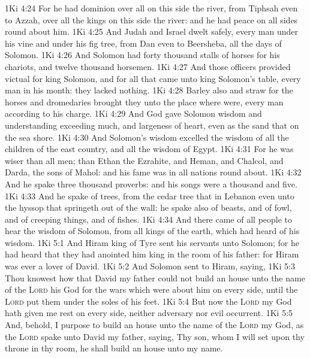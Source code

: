 \vs 1Ki 4:24 For he had dominion over all  on this side the river, from Tiphsah even to Azzah, over all the kings on this side the river: and he had peace on all sides round about him.
\vs 1Ki 4:25 And Judah and Israel dwelt safely, every man under his vine and under his fig tree, from Dan even to Beersheba, all the days of Solomon.
\vs 1Ki 4:26 And Solomon had forty thousand stalls of horses for his chariots, and twelve thousand horsemen.
\vs 1Ki 4:27 And those officers provided victual for king Solomon, and for all that came unto king Solomon's table, every man in his month: they lacked nothing.
\vs 1Ki 4:28 Barley also and straw for the horses and dromedaries brought they unto the place where  were, every man according to his charge.
\vs 1Ki 4:29 And God gave Solomon wisdom and understanding exceeding much, and largeness of heart, even as the sand that  on the sea shore.
\vs 1Ki 4:30 And Solomon's wisdom excelled the wisdom of all the children of the east country, and all the wisdom of Egypt.
\vs 1Ki 4:31 For he was wiser than all men; than Ethan the Ezrahite, and Heman, and Chalcol, and Darda, the sons of Mahol: and his fame was in all nations round about.
\vs 1Ki 4:32 And he spake three thousand proverbs: and his songs were a thousand and five.
\vs 1Ki 4:33 And he spake of trees, from the cedar tree that  in Lebanon even unto the hyssop that springeth out of the wall: he spake also of beasts, and of fowl, and of creeping things, and of fishes.
\vs 1Ki 4:34 And there came of all people to hear the wisdom of Solomon, from all kings of the earth, which had heard of his wisdom.
\vs 1Ki 5:1 And Hiram king of Tyre sent his servants unto Solomon; for he had heard that they had anointed him king in the room of his father: for Hiram was ever a lover of David.
\vs 1Ki 5:2 And Solomon sent to Hiram, saying,
\vs 1Ki 5:3 Thou knowest how that David my father could not build an house unto the name of the \textsc{Lord} his God for the wars which were about him on every side, until the \textsc{Lord} put them under the soles of his feet.
\vs 1Ki 5:4 But now the \textsc{Lord} my God hath given me rest on every side,  neither adversary nor evil occurrent.
\vs 1Ki 5:5 And, behold, I purpose to build an house unto the name of the \textsc{Lord} my God, as the \textsc{Lord} spake unto David my father, saying, Thy son, whom I will set upon thy throne in thy room, he shall build an house unto my name.
